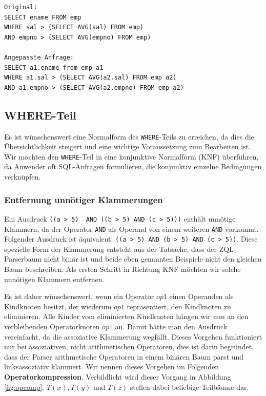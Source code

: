 \begin{verbatim}
Original:
SELECT ename FROM emp 
WHERE sal > (SELECT AVG(sal) FROM emp) 
AND empno > (SELECT AVG(empno) FROM emp)

Angepasste Anfrage:
SELECT a1.ename from emp a1 
WHERE a1.sal > (SELECT AVG(a2.sal) FROM emp a2)
AND a1.empno > (SELECT AVG(a2.empno) FROM emp a2)
\end{verbatim}

\subsection{WHERE-Teil}
\label{subsec:where}

Es ist wünschenswert eine Normalform des \verb|WHERE|-Teils zu erreichen, da dies die Übersichtlichkeit steigert und eine wichtige Voraussetzung zum Bearbeiten ist. Wir möchten den \verb|WHERE|-Teil in eine konjunktive Normalform (KNF) überführen, da Anwender oft SQL-Anfragen formulieren, die konjunktiv einzelne Bedingungen verknüpfen. 

\subsubsection{Entfernung unnötiger Klammerungen}
\label{subsubsec:opcomp}

Ein Ausdruck \verb|((a > 5)  AND ((b > 5) AND (c > 5)))| enthält unnötige Klammern, da der Operator \verb|AND| als Operand von einem weiteren \verb|AND| vorkommt. Folgender Ausdruck ist äquivalent: \verb|((a > 5) AND (b > 5) AND (c > 5))|. Diese spezielle Form der Klammerung entsteht aus der Tatsache, dass der ZQL-Parserbaum nicht binär ist und beide eben genannten Beispiele nicht den gleichen Baum beschreiben. Als ersten Schritt in Richtung KNF möchten wir solche unnötigen Klammern entfernen. 

Es ist daher wünschenswert, wenn ein Operator $op1$ einen Operanden als Kindknoten besitzt, der wiederum $op1$ repräsentiert, den Kindknoten zu eliminieren. Alle Kinder vom eliminierten Kindknoten hängen wir nun an den verbleibenden Operatorknoten $op1$ an. Damit hätte man den Ausdruck vereinfacht, da die assoziative Klammerung wegfällt. Dieses Vorgehen funktioniert nur bei assoziativen, nicht arithmetischen Operatoren, dies ist darin begründet, dass der Parser arithmetische Operatoren in einem binären Baum parst und linksassoziativ klammert. Wir nennen dieses Vorgehen im Folgenden \textbf{Operatorkompression}. Verbildlicht wird dieser Vorgang in Abbildung \ref{fig:opcomp}. $T(x), T(y)$ und $T(z)$ stellen dabei beliebige Teilbäume dar.

